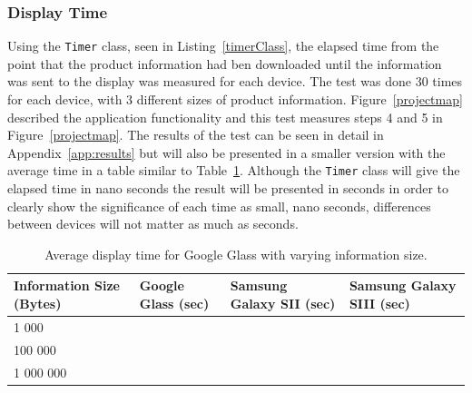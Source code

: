 \subsubsection{Display Time}

Using the \texttt{Timer} class, seen in Listing~\ref{timerClass}, the elapsed time from the point that the product information had ben downloaded until the information was sent to the display was measured for each device. The test was done 30 times for each device, with 3 different sizes of product information. Figure~\ref{projectmap} described the application functionality and this test measures steps 4 and 5 in Figure~\ref{projectmap}. The results of the test can be seen in detail in Appendix~\ref{app:results} but will also be presented in a smaller version with the average time in a table similar to Table~\ref{tab:averageDisplaySpeedGoogleGlass}. Although the \texttt{Timer} class will give the elapsed time in nano seconds the result will be presented in seconds in order to clearly show the significance of each time as small, nano seconds, differences between devices will not matter as much as seconds.

	\begin{table}[ht!]
    		\caption{Average display time for Google Glass with varying information size.} \label{tab:averageDisplaySpeedGoogleGlass}
		\centering \begin{tabularx}{\textwidth}{l|X|X|X} \hline
		\textbf{Information Size (Bytes)} & \textbf{Google Glass (sec)}  & \textbf{Samsung Galaxy SII (sec)}  & \textbf{Samsung Galaxy SIII (sec)} \\ \hline \hline
       
		1 000		&	&	&	 \\ \hline
		100 000		&	&	&	 \\ \hline
		1 000 000		&	&	&	 \\ \hline

		\end{tabularx}
	\end{table}